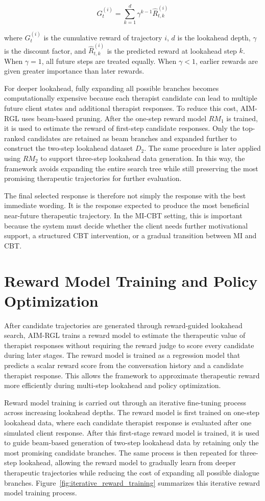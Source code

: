 \[
G_t^{(i)} = \sum_{k=1}^{d} \gamma^{k-1}\hat{R}_{t,k}^{(i)}
\]

where \(G_t^{(i)}\) is the cumulative reward of trajectory \(i\), \(d\) is the lookahead depth, \(\gamma\) is the discount factor, and \(\hat{R}_{t,k}^{(i)}\) is the predicted reward at lookahead step \(k\). When \(\gamma = 1\), all future steps are treated equally. When \(\gamma < 1\), earlier rewards are given greater importance than later rewards.

For deeper lookahead, fully expanding all possible branches becomes computationally expensive because each therapist candidate can lead to multiple future client states and additional therapist responses. To reduce this cost, AIM-RGL uses beam-based pruning. After the one-step reward model \(RM_1\) is trained, it is used to estimate the reward of first-step candidate responses. Only the top-ranked candidates are retained as beam branches and expanded further to construct the two-step lookahead dataset \(D_2\). The same procedure is later applied using \(RM_2\) to support three-step lookahead data generation. In this way, the framework avoids expanding the entire search tree while still preserving the most promising therapeutic trajectories for further evaluation.

The final selected response is therefore not simply the response with the best immediate wording. It is the response expected to produce the most beneficial near-future therapeutic trajectory. In the MI-CBT setting, this is important because the system must decide whether the client needs further motivational support, a structured CBT intervention, or a gradual transition between MI and CBT.

\section{Reward Model Training and Policy Optimization}

After candidate trajectories are generated through reward-guided lookahead search, AIM-RGL trains a reward model to estimate the therapeutic value of therapist responses without requiring the reward judge to score every candidate during later stages. The reward model is trained as a regression model that predicts a scalar reward score from the conversation history and a candidate therapist response. This allows the framework to approximate therapeutic reward more efficiently during multi-step lookahead and policy optimization.

Reward model training is carried out through an iterative fine-tuning process across increasing lookahead depths. The reward model is first trained on one-step lookahead data, where each candidate therapist response is evaluated after one simulated client response. After this first-stage reward model is trained, it is used to guide beam-based generation of two-step lookahead data by retaining only the most promising candidate branches. The same process is then repeated for three-step lookahead, allowing the reward model to gradually learn from deeper therapeutic trajectories while reducing the cost of expanding all possible dialogue branches. Figure~\ref{fig:iterative_reward_training} summarizes this iterative reward model training process.

